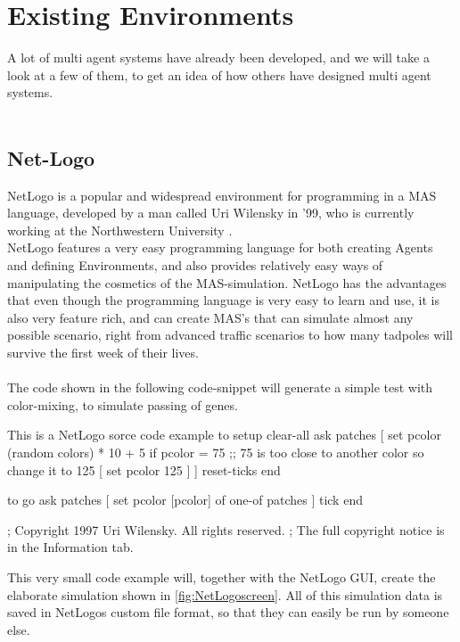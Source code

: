 \chapter{Existing Environments}

A lot of multi agent systems have already been developed, and we will take a look at a few of them, to get an idea of how others have designed multi agent systems.\\
\\
\section{Net-Logo}
NetLogo is a popular and widespread environment for programming in a MAS language, developed by a man called Uri Wilensky in '99, who is currently working at the Northwestern University \cite{misc:northwestern}.\\ \indent NetLogo features a very easy programming language for both creating Agents and defining Environments, and also provides relatively easy ways of manipulating the cosmetics of the MAS-simulation. NetLogo has the advantages that even though the programming language is very easy to learn and use, it is also very feature rich, and can create MAS's that can simulate almost any possible scenario, right from advanced traffic scenarios to how many tadpoles will survive the first week of their lives. \\
\\
The code shown in the following code-snippet will generate a simple test with color-mixing, to simulate passing of genes.

\begin{NetLogo}{This is a NetLogo sorce code example}{}
to setup
  clear-all
  ask patches
    [ set pcolor (random colors) * 10 + 5
        if pcolor = 75  ;; 75 is too close to another color so change it to 125
          [ set pcolor 125 ] ]
  reset-ticks
end

to go
  ask patches [ set pcolor [pcolor] of one-of patches ]
  tick
end


; Copyright 1997 Uri Wilensky. All rights reserved.
; The full copyright notice is in the Information tab.
\end{NetLogo}

This very small code example will, together with the NetLogo GUI, create the elaborate simulation shown in \ref{fig:NetLogoscreen}. All of this simulation data is saved in NetLogos custom file format, so that they can easily be run by someone else.

